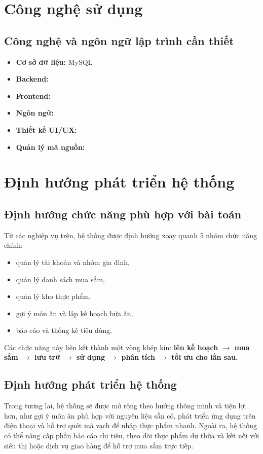 \documentclass[12pt,a4paper]{report}
\begin{document}
\chapter{Công nghệ sử dụng}
\section{Công nghệ và ngôn ngữ lập trình cần thiết}
\begin{itemize}
    \item \textbf{Cơ sở dữ liệu:} MySQL
    \item \textbf{Backend:} 
    \item \textbf{Frontend:} 
    \item \textbf{Ngôn ngữ:} 
    \item \textbf{Thiết kế UI/UX:} 
    \item \textbf{Quản lý mã nguồn:} 
\end{itemize}

\chapter{Định hướng phát triển hệ thống}
\section{Định hướng chức năng phù hợp với bài toán}
Từ các nghiệp vụ trên, hệ thống được định hướng xoay quanh 5 nhóm chức năng chính:
\begin{itemize}
    \item quản lý tài khoản và nhóm gia đình,
    \item quản lý danh sách mua sắm,
    \item quản lý kho thực phẩm,
    \item gợi ý món ăn và lập kế hoạch bữa ăn,
    \item báo cáo và thống kê tiêu dùng.
\end{itemize}
Các chức năng này liên kết thành một vòng khép kín:\newline
\textbf{lên kế hoạch $\rightarrow$ mua sắm $\rightarrow$ lưu trữ $\rightarrow$ sử dụng $\rightarrow$ phân tích $\rightarrow$ tối ưu cho lần sau.}
\section{Định hướng phát triển hệ thống}

Trong tương lai, hệ thống sẽ được mở rộng theo hướng thông minh và tiện lợi hơn, như gợi ý món ăn phù hợp với nguyên liệu sẵn có, phát triển ứng dụng trên điện thoại và hỗ trợ quét mã vạch để nhập thực phẩm nhanh.
\newline
Ngoài ra, hệ thống có thể nâng cấp phần báo cáo chi tiêu, theo dõi thực phẩm dư thừa và kết nối với siêu thị hoặc dịch vụ giao hàng để hỗ trợ mua sắm trực tiếp.
\end{document}
